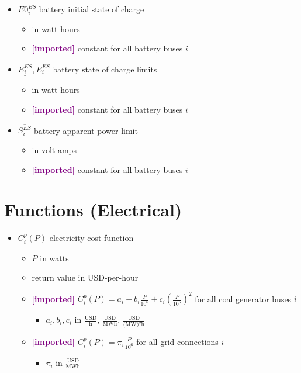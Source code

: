 \documentclass{article}
\newcommand{\lo}[1]{\underline{#1}}
\newcommand{\hi}[1]{\overline{#1}}
\newcommand{\imported}{\textcolor{purple}{\textbf{[imported] }}}
\begin{document}
\begin{itemize}
\item $E0^{ES}_i$ battery initial state of charge
  \begin{itemize}
  \item in watt-hours
  \item \imported constant for all battery buses $i$
  \end{itemize}

\item $\lo{E^{ES}_i}, \hi{E^{ES}_i}$ battery state of charge limits
  \begin{itemize}
  \item in watt-hours
  \item \imported constant for all battery buses $i$
  \end{itemize}

\item $\hi{S^{ES}_i}$ battery apparent power limit
  \begin{itemize}
  \item in volt-amps
  \item \imported constant for all battery buses $i$
  \end{itemize}

\end{itemize}


\section{Functions (Electrical)}
\begin{itemize}
\item $C^p_i(P)$ electricity cost function
  \begin{itemize}
  \item $P$ in watts
  \item return value in USD-per-hour

  \item \imported
    $C^p_i(P) = a_i + b_i\frac{P}{10^6} + c_i\left(\frac{P}{10^6}\right)^2$
    for all coal generator buses $i$
    \begin{itemize}
    \item $a_i, b_i, c_i$ in $\frac{\text{USD}}{\text{h}}$,
      $\frac{\text{USD}}{\text{MWh}}$, $\frac{\text{USD}}{\text{(MW)$^2$h}}$
    \end{itemize}

  \item \imported $C^p_i(P) = \pi_i\frac{P}{10^6}$ for all grid connections $i$
    \begin{itemize}
    \item $\pi_i$ in $\frac{\text{USD}}{\text{MWh}}$
    \end{itemize}
  \end{itemize}
\end{itemize}
\end{document}
